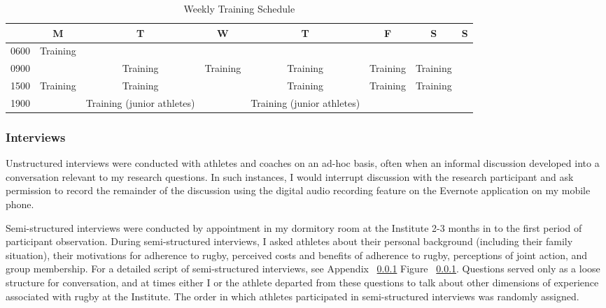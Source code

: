   \begin{landscape}
    \begin{table}[htpb]\caption{Weekly Training Schedule}
      \begin{center}
        \begin{small}
            \begin{tabular}{| c | c | c | c | c | c | c | c |}
              \hline
              & \bf M & \bf T & \bf W & \bf T & \bf F & \bf S & \bf S \\
              \hline
              0600 & Training &  &  & & & & \\
              \hline
              0900 &  & Training & Training & Training & Training & Training &  \\
                \hline
              1500 & Training & Training & & Training & Training & Training &  \\
                \hline
              1900 &  & Training (junior athletes) & & Training (junior athletes) & & & \\
                 \hline
            \end{tabular}
                \label{tab:tournamentData}
          \end{small}
        \end{center}
      \end{table}
  \end{landscape}
  \restoregeometry



  \subsubsection{Interviews}

Unstructured interviews were conducted with athletes and coaches on an ad-hoc basis, often when an informal discussion developed into a conversation relevant to my research questions. In such instances, I would interrupt discussion with the research participant and ask permission to record the remainder of the discussion using the digital audio recording feature on the Evernote application on my mobile phone.

Semi-structured interviews were conducted by appointment in my dormitory room at the Institute 2-3 months in to the first period of participant observation.  During semi-structured interviews, I asked athletes about their personal background (including their family situation), their motivations for adherence to rugby, perceived costs and benefits of adherence to rugby, perceptions of joint action, and group membership. For a detailed script of semi-structured interviews, see Appendix ~\ref{} Figure ~\ref{}.  Questions served only as a loose structure for conversation, and at times either I or the athlete departed from these questions to talk about other dimensions of experience associated with rugby at the Institute.  The order in which athletes participated in semi-structured interviews was randomly assigned.

